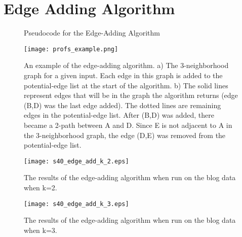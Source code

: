 \section{Edge Adding Algorithm}


\begin{figure}[htb]
	\begin{algorithmic}
		\renewcommand{\algorithmicrequire}{\textbf{Input:}}
		\renewcommand{\algorithmicensure}{\textbf{Output:}}
			\EndIf
			\EndIf
		\EndWhile
	\end{algorithmic}
	\caption{Pseudocode for the Edge-Adding Algorithm}

\end{figure}

\begin{figure}[htb]
\texttt{[image: profs\_example.png]}
	\caption{An example of the edge-adding algorithm. a) The 3-neighborhood graph for a given input. Each edge in this graph is added to the potential-edge list at the start of the algorithm. b) The solid lines represent edges that will be in the graph the algorithm returns (edge (B,D) was the last edge added). The dotted lines are remaining edges in the potential-edge list. After (B,D) was added, there became a 2-path between A and D. Since E is not adjacent to A in the 3-neighborhood graph, the edge (D,E) was removed from the potential-edge list.}
	\label{fig:edge-adding}
\end{figure}

\begin{figure}[htb]
\texttt{[image: s40\_edge\_add\_k\_2.eps]}
	\caption{The results of the edge-adding algorithm when run on the blog data when k=2. }
	\label{fig:edge-adding k=2}
\end{figure}

\begin{figure}[htb]
\texttt{[image: s40\_edge\_add\_k\_3.eps]}
	\caption{The results of the edge-adding algorithm when run on the blog data when k=3. }
	\label{fig:edge-adding k=3}
\end{figure}

